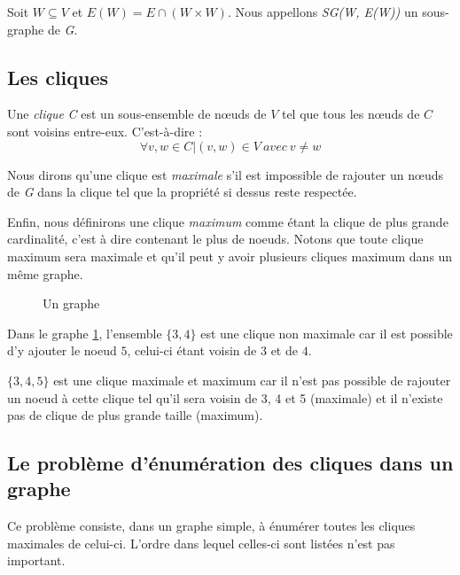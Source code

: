 \documentclass[a4paper, 12pt]{article}
\begin{document}
Soit $ W \subseteq V $ et $ E(W) = E \cap (W \times W) $. Nous appellons \emph{SG(W, E(W))} un sous-graphe de \emph{G}.

\subsection{Les cliques}%
\label{subsec:cliques}

Une \textit{clique} \emph{C} est un sous-ensemble de nœuds de $ V $ tel que tous les nœuds de $ C $ sont voisins entre-eux. C'est-à-dire :
$$ \forall v, w \in C | (v, w)\in V \ avec\  v \neq w$$

Nous dirons qu'une clique est \textit{maximale} s'il est impossible de rajouter un nœuds de \emph{G} dans la clique tel que la propriété si dessus reste respectée.

Enfin, nous définirons une clique \textit{maximum} comme étant la clique de plus grande cardinalité, c'est à dire contenant le plus de noeuds. Notons que toute clique maximum sera maximale et qu'il peut y avoir plusieurs cliques maximum dans un même graphe.

\begin{figure}[h]
  \begin{center}
\caption{Un graphe}
  \label{fig:x example graph}
\end{center}
\end{figure}

Dans le graphe \ref{fig:x example graph}, l'ensemble $ \{3, 4\} $ est une clique non maximale car il est possible d'y ajouter le noeud $ 5 $, celui-ci étant voisin de $ 3 $ et de $ 4 $.

$ \{3, 4, 5\}$ est une clique maximale et maximum car il n'est pas possible de rajouter un noeud à cette clique tel qu'il sera voisin de 3, 4 et 5 (maximale) et il n'existe pas de clique de plus grande taille (maximum).

\subsection{Le problème d'énumération des cliques dans un graphe}
Ce problème consiste, dans un graphe simple, à énumérer toutes les cliques maximales de celui-ci. L'ordre dans lequel celles-ci sont listées n'est pas important.
\end{document}
